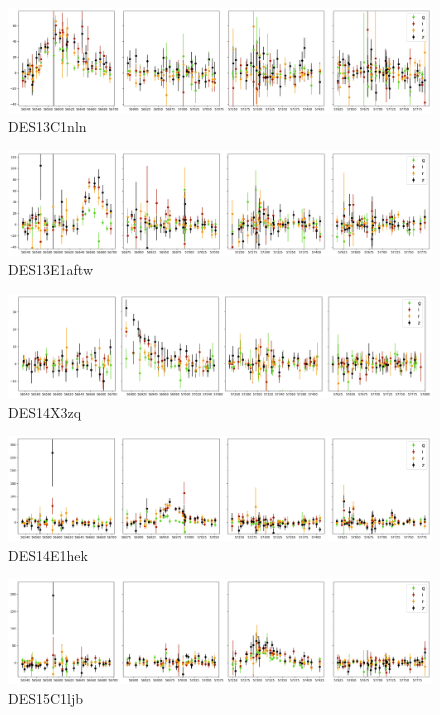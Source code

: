 \begin{figure}[H]
  \centering
  \includegraphics[width=\textwidth]{Figures/Appendix/CNN/1254649.png}
  \caption{DES13C1nln}
\end{figure}

\begin{figure}[H]
  \centering
  \includegraphics[width=\textwidth]{Figures/Appendix/CNN/1286337.png}
  \caption{DES13E1aftw}
\end{figure}

\begin{figure}[H]
  \centering
  \includegraphics[width=\textwidth]{Figures/Appendix/CNN/1293145.png}
  \caption{DES14X3zq}
\end{figure}

\begin{figure}[H]
  \centering
  \includegraphics[width=\textwidth]{Figures/Appendix/CNN/1303753.png}
  \caption{DES14E1hek}
\end{figure}

\begin{figure}[H]
  \centering
  \includegraphics[width=\textwidth]{Figures/Appendix/CNN/1331668.png}
  \caption{DES15C1ljb}
\end{figure}

